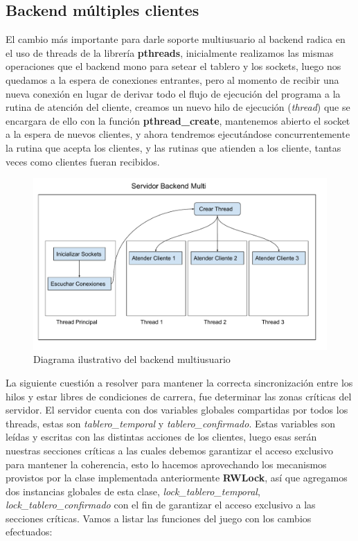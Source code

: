 \subsection{Backend múltiples clientes}

El cambio más importante para darle soporte multiusuario al backend radica en el uso de threads de la librería \textbf{pthreads}, inicialmente realizamos las mismas operaciones que el backend mono para setear el tablero y los sockets, luego nos quedamos a la espera de conexiones entrantes, pero al momento de recibir una nueva conexión en lugar de derivar todo el flujo de ejecución del programa a la rutina de atención del cliente, creamos un nuevo hilo de ejecución (\textit{thread}) que se encargara de ello con la función \textbf{pthread\_create}, mantenemos abierto el socket a la espera de nuevos clientes, y ahora tendremos ejecutándose concurrentemente la rutina que acepta los clientes, y las rutinas que atienden a los cliente, tantas veces como clientes fueran recibidos.

\begin{figure}[H]
  \begin{center}
	\includegraphics[scale = 0.4]{./imagenes/so_tp2_2.pdf}
	\caption{Diagrama ilustrativo del backend multiusuario}
	\label{fig:fig2}
  \end{center}
\end{figure}

La siguiente cuestión a resolver para mantener la correcta sincronización entre los hilos y estar libres de condiciones de carrera, fue determinar las zonas críticas del servidor. El servidor cuenta con dos variables globales compartidas por todos los threads, estas son \textit{tablero\_temporal} y \textit{tablero\_confirmado}. Estas variables son leídas y escritas con las distintas acciones de los clientes, luego esas serán nuestras secciones críticas a las cuales debemos garantizar el acceso exclusivo para mantener la coherencia, esto lo hacemos aprovechando los mecanismos provistos por la clase implementada anteriormente \textbf{RWLock}, así que agregamos dos instancias globales de esta clase, \textit{lock\_tablero\_temporal}, \textit{lock\_tablero\_confirmado} con el fin de garantizar el acceso exclusivo a las secciones críticas. Vamos a listar las funciones del juego con los cambios efectuados:

